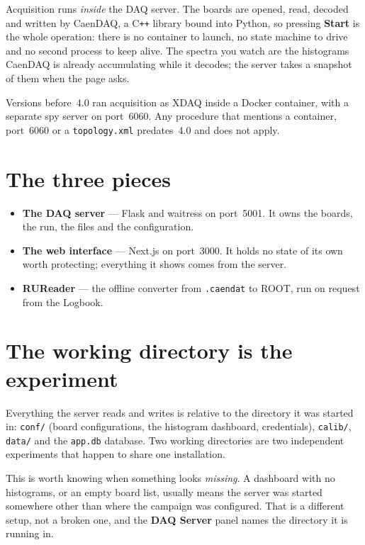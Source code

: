 \documentclass[11pt,a4paper]{report}
\newcommand{\ui}[1]{\textbf{#1}}          %
\newcommand{\file}[1]{\texttt{#1}}
\begin{document}
Acquisition runs \emph{inside} the DAQ server. The boards are opened, read,
decoded and written by CaenDAQ, a C\texttt{++} library bound into Python, so
pressing \ui{Start} is the whole operation: there is no container to launch, no
state machine to drive and no second process to keep alive. The spectra you watch
are the histograms CaenDAQ is already accumulating while it decodes; the server
takes a snapshot of them when the page asks.

Versions before~4.0 ran acquisition as XDAQ inside a Docker container, with a
separate spy server on port~6060. Any procedure that mentions a container,
port~6060 or a \file{topology.xml} predates~4.0 and does not apply.

\section{The three pieces}

\begin{itemize}
  \item \textbf{The DAQ server} --- Flask and waitress on port~5001. It owns the
        boards, the run, the files and the configuration.
  \item \textbf{The web interface} --- Next.js on port~3000. It holds no state of
        its own worth protecting; everything it shows comes from the server.
  \item \textbf{RUReader} --- the offline converter from \file{.caendat} to ROOT,
        run on request from the Logbook.
\end{itemize}

\section{The working directory is the experiment}

Everything the server reads and writes is relative to the directory it was started
in: \file{conf/} (board configurations, the histogram dashboard, credentials),
\file{calib/}, \file{data/} and the \file{app.db} database. Two working
directories are two independent experiments that happen to share one
installation.

This is worth knowing when something looks \emph{missing}. A dashboard with no
histograms, or an empty board list, usually means the server was started somewhere
other than where the campaign was configured. That is a different setup, not a
broken one, and the \ui{DAQ Server} panel names the directory it is running in.
\end{document}

